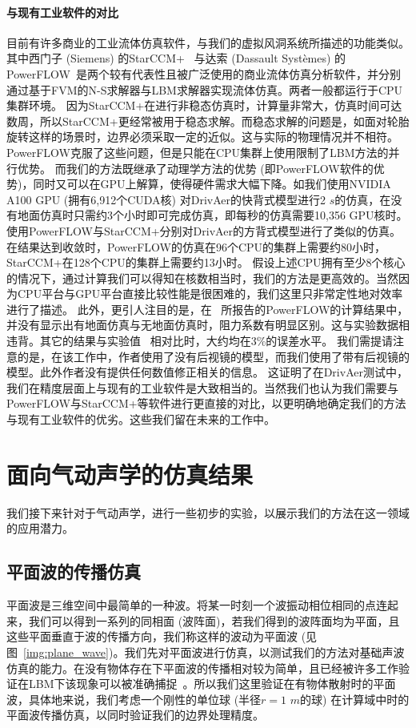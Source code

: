 \paragraph{与现有工业软件的对比}
目前有许多商业的工业流体仿真软件，与我们的虚拟风洞系统所描述的功能类似。其中西门子 (Siemens) 的StarCCM+~\citep{Siemens} 与达索 (Dassault Syst{\`e}mes) 的PowerFLOW~\citep{powerflow}是两个较有代表性且被广泛使用的商业流体仿真分析软件，并分别通过基于FVM的N-S求解器与LBM求解器实现流体仿真。两者一般都运行于CPU集群环境。
因为StarCCM+在进行非稳态仿真时，计算量非常大，仿真时间可达数周，所以StarCCM+更经常被用于稳态求解。而稳态求解的问题是，如面对轮胎旋转这样的场景时，边界必须采取一定的近似。这与实际的物理情况并不相符。PowerFLOW克服了这些问题，但是只能在CPU集群上使用限制了LBM方法的并行优势。
而我们的方法既继承了动理学方法的优势 (即PowerFLOW软件的优势)，同时又可以在GPU上解算，使得硬件需求大幅下降。如我们使用NVIDIA A100 GPU (拥有6,912个CUDA核) 对DrivAer的快背式模型进行2 $s$的仿真，在没有地面仿真时只需约3个小时即可完成仿真，即每秒的仿真需要10,356 GPU核时。
\citet{James-2018} 使用PowerFLOW与StarCCM+分别对DrivAer的方背式模型进行了类似的仿真。在结果达到收敛时，PowerFLOW的仿真在96个CPU的集群上需要约80小时，StarCCM+在128个CPU的集群上需要约13小时。
假设上述CPU拥有至少8个核心的情况下，通过计算我们可以得知在核数相当时，我们的方法是更高效的。当然因为CPU平台与GPU平台直接比较性能是很困难的，我们这里只非常定性地对效率进行了描述。
此外，更引人注目的是，在~\citet{James-2018} 所报告的PowerFLOW的计算结果中，并没有显示出有地面仿真与无地面仿真时，阻力系数有明显区别。这与实验数据相违背。其它的结果与实验值~\citep{Heft-2012b} 相对比时，大约均在3\%的误差水平。
我们需提请注意的是，在该工作中，作者使用了没有后视镜的模型，而我们使用了带有后视镜的模型。此外作者没有提供任何数值修正相关的信息。
这证明了在DrivAer测试中，我们在精度层面上与现有的工业软件是大致相当的。当然我们也认为我们需要与PowerFLOW与StarCCM+等软件进行更直接的对比，以更明确地确定我们的方法与现有工业软件的优劣。这些我们留在未来的工作中。

\section{面向气动声学的仿真结果}
我们接下来针对于气动声学，进行一些初步的实验，以展示我们的方法在这一领域的应用潜力。
\subsection{平面波的传播仿真}
平面波是三维空间中最简单的一种波。将某一时刻一个波振动相位相同的点连起来，我们可以得到一系列的同相面 (波阵面)，若我们得到的波阵面均为平面，且这些平面垂直于波的传播方向，我们称这样的波动为平面波 (见图~\ref{img:plane_wave})。我们先对平面波进行仿真，以测试我们的方法对基础声波仿真的能力。在没有物体存在下平面波的传播相对较为简单，且已经被许多工作验证在LBM下该现象可以被准确捕捉~\cite{doi:10.2514/6.2009-3395, viggen2009lattice}。所以我们这里验证在有物体散射时的平面波，具体地来说，我们考虑一个刚性的单位球 (半径$r=1$ $m$的球) 在计算域中时的平面波传播仿真，以同时验证我们的边界处理精度。

